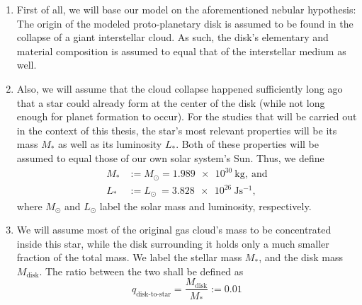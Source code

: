     \begin{enumerate}
        \item \assume{} First of all, we will base our model on the aforementioned nebular 
            hypothesis: The origin of the modeled proto-planetary disk is assumed to be found in 
            the collapse of a giant interstellar cloud. %
            As such, the disk's elementary and material composition is assumed to equal that of the 
            interstellar medium as well. \\
    
        \item \assume{} Also, we will assume that the cloud collapse happened sufficiently long ago 
            that a star could already form at the center of the disk (while not long enough for 
            planet formation to occur).
            For the studies that will be carried out in the context of this thesis, the star's most
            relevant properties will be its mass $M_*$ as well as its luminosity $L_*$. 
            \assume{}
            Both of these properties will be assumed to equal those of our own solar system's Sun. 
            Thus, we define
            \begin{align}
                M_*&:=M_\odot=\SI{1.989e30}{\kg},\ \text{and} \\
                L_*&:=L_\odot\ =\SI{3.828e26}{\joule\second^{-1}},
            \end{align}
            where $M_\odot$ and $L_\odot$ label the solar mass and luminosity, respectively.
    
        \item
            We will assume most of the original gas cloud's mass to be concentrated inside this 
            star, while the disk surrounding it holds only a much smaller fraction of the total 
            mass. We label the stellar mass $M_*$, and the disk mass $M_\text{disk}$. 
            The ratio between the two shall be defined as
            \begin{equation}
                q_\text{disk-to-star}
                    =\frac{M_\text{disk}}{M_*}  
                    :=0.01
            \end{equation}
    

\end{enumerate}
